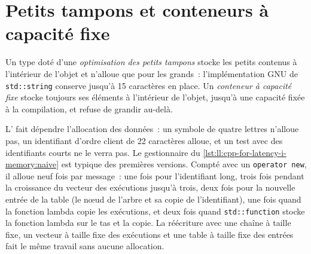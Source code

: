 \section{Petits tampons et conteneurs à capacité fixe}

\begin{definition}\label{def:ll:cpp-for-latency-i-memory:sbo}
Un type doté d'une \emph{optimisation des petits tampons} stocke les petits contenus à l'intérieur de l'objet et
n'alloue que pour les grands~: l'implémentation GNU de \texttt{std::string} conserve jusqu'à 15 caractères en place. Un
\emph{conteneur à capacité fixe} stocke toujours ses éléments à l'intérieur de l'objet, jusqu'à une
capacité fixée à la compilation, et refuse de grandir au-delà.
\end{definition}

L' fait dépendre l'allocation des données~: un symbole de quatre lettres n'alloue pas, un identifiant
d'ordre client de 22 caractères alloue, et un test avec des identifiants courts ne le verra pas. Le gestionnaire du
\cref{lst:ll:cpp-for-latency-i-memory:naive} est typique des premières versions. Compté avec un
\texttt{operator new}, il alloue neuf fois par message~: une fois pour l'identifiant long, trois fois pendant la croissance du vecteur des exécutions jusqu'à trois, deux fois
pour la nouvelle entrée de la table (le nœud de l'arbre et sa copie de l'identifiant), une fois quand la fonction lambda copie les exécutions, et deux fois quand
\texttt{std::function} stocke la fonction lambda sur le tas et la copie. La réécriture avec une chaîne à taille fixe, un vecteur à taille fixe
des exécutions et une table à taille fixe des entrées fait le même travail sans aucune allocation.

